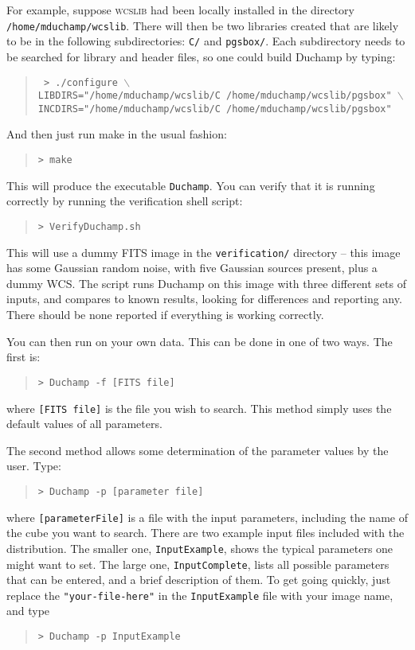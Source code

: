 For example, suppose \textsc{wcslib} had been locally installed in the
directory \texttt{/home/mduchamp/wcslib}. There will then be two
libraries created that are likely to be in the following
subdirectories: \texttt{C/} and \texttt{pgsbox/}. Each subdirectory
needs to be searched for library and header files, so one could build
Duchamp by typing:
\begin{quote}
{\footnotesize
\texttt{%
>  ./configure $\backslash$ \\ 
LIBDIRS="/home/mduchamp/wcslib/C /home/mduchamp/wcslib/pgsbox" 
$\backslash$\\
INCDIRS="/home/mduchamp/wcslib/C /home/mduchamp/wcslib/pgsbox"}
}
\end{quote}
And then just run make in the usual fashion:
\begin{quote}
{\footnotesize
\texttt{> make}
}
\end{quote}

This will produce the executable \texttt{Duchamp}. You can verify that
it is running correctly by running the verification shell script:
\begin{quote}
{\footnotesize
\texttt{> VerifyDuchamp.sh}
}
\end{quote}
This will use a dummy FITS image in the \texttt{verification/}
directory -- this image has some Gaussian random noise, with five
Gaussian sources present, plus a dummy WCS. The script runs
Duchamp on this image with three different sets of inputs, and
compares to known results, looking for differences and reporting
any. There should be none reported if everything is working correctly.

You can then run \duchamp on your own data. This can be done in one
of two ways. The first is:
\begin{quote}
{\footnotesize
\texttt{> Duchamp -f [FITS file]}
}
\end{quote}
where \texttt{[FITS file]} is the file you wish to search. This method
simply uses the default values of all parameters.

The second method allows some determination of the parameter values by
the user. Type:
\begin{quote}
{\footnotesize
\texttt{> Duchamp -p [parameter file]}
}
\end{quote}
where \texttt{[parameterFile]} is a file with the input parameters,
including the name of the cube you want to search. There are two
example input files included with the distribution. The smaller one,
\texttt{InputExample}, shows the typical parameters one might want to
set. The large one, \texttt{InputComplete}, lists all possible
parameters that can be entered, and a brief description of them. To
get going quickly, just replace the \texttt{"your-file-here"} in the
\texttt{InputExample} file with your image name, and type
\begin{quote}
{\footnotesize
\texttt{> Duchamp -p InputExample}
}
\end{quote}

